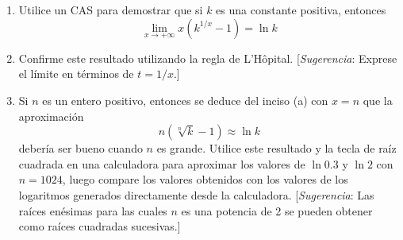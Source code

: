 \documentclass[12pt]{article}
\begin{document}
\begin{enumerate}[label=\alph*)]
\item Utilice un CAS para demostrar que si $k$ es una constante positiva, entonces
  \[
  \lim_{x \to +\infty} x(k^{1/x}-1)=\ln{k}
  \]
\item Confirme este resultado utilizando la regla de L'Hôpital. [\textit{Sugerencia}: Exprese el límite en términos de $t = 1/x$.]
\item Si $n$ es un entero positivo, entonces se deduce del inciso (a) con $x = n$ que la aproximación
  \[
  n(\sqrt[n]{k}-1)\approx \ln{k}
\]
debería ser bueno cuando $n$ es grande. Utilice este resultado y la tecla de raíz cuadrada en una calculadora para aproximar los valores de $\ln{0.3}$ y $\ln{2}$ con $n = 1024$, luego compare los valores obtenidos con los valores de los logaritmos generados directamente desde la calculadora. [\textit{Sugerencia}: Las raíces enésimas para las cuales $n$ es una potencia de 2 se pueden obtener como raíces cuadradas sucesivas.]
\end{enumerate}
\end{document}
